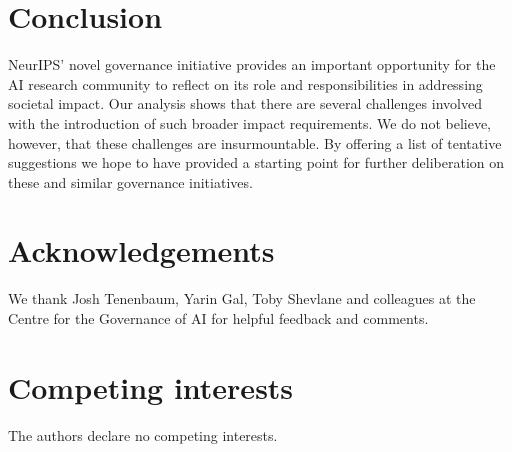 \documentclass[11pt,english]{article}
\begin{document}
	\section*{Conclusion}
	NeurIPS' novel governance initiative provides an important opportunity for the AI research community to reflect on its role and responsibilities in addressing societal impact. Our analysis shows that there are several challenges involved with the introduction of such broader impact requirements.  We do not believe, however, that these challenges are insurmountable. By offering a list of tentative suggestions we hope to have provided a starting point for further deliberation on these and similar governance initiatives. 
	
	
	\section*{Acknowledgements}
	We thank Josh Tenenbaum, Yarin Gal, Toby Shevlane and colleagues at the Centre for the Governance of AI for helpful feedback and comments. 
	
	\section*{Competing interests}
	The authors declare no competing interests. 
	
	
	
\end{document}
